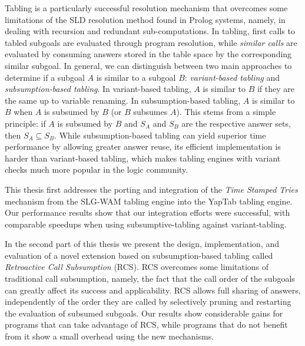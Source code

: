 Tabling is a particularly successful resolution mechanism that overcomes some limitations
of the SLD resolution method found in Prolog systems, namely, in dealing with recursion and redundant
sub-computations. In tabling, first calls to tabled subgoals are evaluated through
program resolution, while \emph{similar calls} are evaluated by consuming answers stored
in the table space by the corresponding similar subgoal.
In general, we can distinguish between two main approaches to determine if a subgoal $A$ is
similar to a subgoal $B$: \emph{variant-based tabling} and \emph{subsumption-based tabling}.
In variant-based tabling, $A$ is similar to $B$ if they are the same
up to variable renaming. In subsumption-based tabling, $A$ is similar to $B$ when $A$ is subsumed
by $B$ (or $B$ subsumes $A$). This stems from a simple principle: if $A$ is subsumed by $B$ and
$S_A$ and $S_B$ are the respective answer sets, then $S_A \subseteq S_B$.
While subsumption-based tabling can yield superior time performance by allowing greater answer
reuse, its efficient implementation is harder than variant-based tabling, which makes tabling engines
with variant checks much more popular in the logic community.

This thesis first addresses the porting and integration of the \emph{Time Stamped Tries} mechanism
from the SLG-WAM tabling engine into the YapTab tabling engine. Our performance results show that our
integration efforts were successful, with comparable speedups when using subsumptive-tabling against
variant-tabling.

In the second part of this thesis we present the design, implementation, and evaluation of a novel extension
based on subsumption-based tabling called \emph{Retroactive Call Subsumption} (RCS). RCS overcomes some limitations
of traditional call subsumption, namely, the fact that the call order of the subgoals can greatly affect its
success and applicability. RCS allows full sharing of answers,
independently of the order they are called by selectively pruning and restarting the evaluation of subsumed
subgoals. Our results show considerable gains for programs that can take advantage of RCS, while programs
that do not benefit from it show a small overhead using the new mechanisms.
